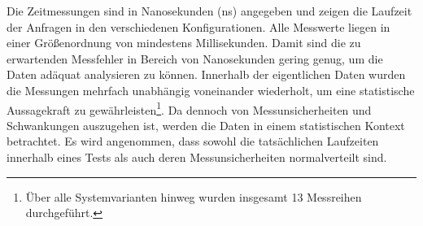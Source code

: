 \begin{table}[!htp]
    \centering
    \caption{Auszug der Daten der Performance-Messung.}
    \label{tab:performance-data}
\end{table}

Die Zeitmessungen sind in Nanosekunden (ns) angegeben und zeigen die Laufzeit der Anfragen in den verschiedenen Konfigurationen.
Alle Messwerte liegen in einer Größenordnung von mindestens Millisekunden.
Damit sind die zu erwartenden Messfehler in Bereich von Nanosekunden gering genug, um die Daten adäquat analysieren zu können.
Innerhalb der eigentlichen Daten wurden die Messungen mehrfach unabhängig voneinander wiederholt, um eine statistische Aussagekraft zu gewährleisten\footnote{Über alle Systemvarianten hinweg wurden insgesamt 13 Messreihen durchgeführt.}.
Da dennoch von Messunsicherheiten und Schwankungen auszugehen ist, werden die Daten in einem statistischen Kontext betrachtet.
Es wird angenommen, dass sowohl die tatsächlichen Laufzeiten innerhalb eines Tests als auch deren Messunsicherheiten normalverteilt sind.

